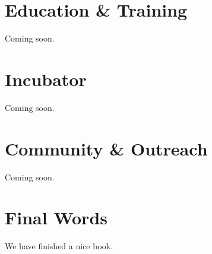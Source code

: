 \documentclass[
]{book}
\begin{document}
\hypertarget{education-training}{%
\chapter{Education \& Training}\label{education-training}}

Coming soon.

\hypertarget{incubator}{%
\chapter{Incubator}\label{incubator}}

Coming soon.

\hypertarget{community-outreach}{%
\chapter{Community \& Outreach}\label{community-outreach}}

Coming soon.

\hypertarget{final-words}{%
\chapter{Final Words}\label{final-words}}

We have finished a nice book.

  
\end{document}
